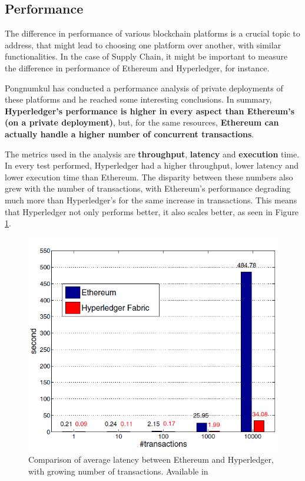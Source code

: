 \subsection{Performance}
The difference in performance of various blockchain platforms is a crucial topic to address, that might lead to choosing one platform over another, with similar functionalities. In the case of Supply Chain, it might be important to measure the difference in performance of Ethereum and Hyperledger, for instance. 

Pongnumkul has conducted a performance analysis of private deployments of these platforms \cite{Pongnumkul2017} and he reached some interesting conclusions. In summary, \textbf{Hyperledger's performance is higher in every aspect than Ethereum's (on a private deployment)}, but, for the same resources, \textbf{Ethereum can actually handle a higher number of concurrent transactions}. 

The metrics used in the analysis are \textbf{throughput}, \textbf{latency} and \textbf{execution} time.
In every test performed, Hyperledger had a higher throughput, lower latency and lower execution time than Ethereum. The disparity between these numbers also grew with the number of transactions, with Ethereum's performance degrading much more than Hyperledger's for the same increase in transactions. This means that Hyperledger not only performs better, it also scales better, as seen in Figure \ref{fig:latency_comparison}.

\begin{figure}[h]
\centering
\includegraphics[scale=0.75]{media/average_latency_frameworks.png}
\caption[Comparison of average latency between Ethereum and Hyperledger, with growing number of transactions]{Comparison of average latency between Ethereum and Hyperledger, with growing number of transactions. Available in \cite{Pongnumkul2017}}
\label{fig:latency_comparison}
\end{figure}

